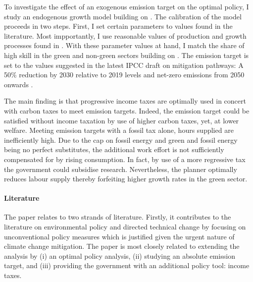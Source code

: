 To investigate the effect of an exogenous emission target on the optimal policy, I study an endogenous growth model building on \cite{Fried2018ClimateAnalysis}. 
The calibration of the model proceeds in two steps. First, I set certain parameters to values found in the literature. Most impportantly, I use reasonable values of production and growth processes found in \cite{Fried2018ClimateAnalysis}. %
With these parameter values at hand, I match the share of high skill in the green and non-green sectors building on \cite{Consoli2016DoCapital}. The emission target is set to the values suggested in the latest IPCC draft on mitigation pathways: A 50\% reduction by 2030 relative to 2019 levels and  net-zero emissions from 2050 onwards \citep{IPCC2022}.

The main finding is that progressive income taxes are optimally used in concert with carbon taxes to meet emission targets. Indeed, the emission target could be satisfied without income taxation by use of higher carbon taxes, yet, at lower welfare.  
Meeting emission targets with a fossil tax alone, hours supplied are inefficiently high. Due to the cap on fossil energy and green and fossil energy being no perfect substitutes, the additional work effort is not sufficiently compensated for by rising consumption.  
In fact, by use of a more regressive tax the government could subsidise research. Nevertheless, the planner optimally reduces labour supply thereby forfeiting higher growth rates in the green sector. %

\paragraph{Literature}
The paper relates to two strands of literature. Firstly, it contributes to the literature on environmental policy and directed technical change \citep[e.g.][]{Acemoglu2012TheChange, Acemoglu2016TransitionTechnology} by focusing on unconventional policy measures which is justified given the urgent nature of climate change mitigation.  The paper is most closely related to \cite{Fried2018ClimateAnalysis} extending the analysis by (i) an optimal policy analysis, (ii) studying an absolute emission target, and (iii) providing the government with an additional policy tool: income taxes.

